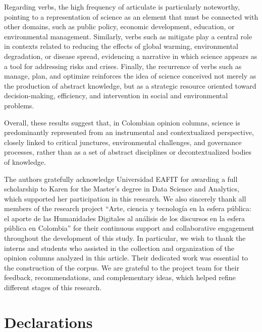 \documentclass[pdflatex,sn-mathphys-num,iicol]{sn-jnl}
\begin{document}
	
	Regarding verbs, the high frequency of articulate is particularly noteworthy, pointing to a representation of science as an element that must be connected with other domains, such as public policy, economic development, education, or environmental management. Similarly, verbs such as mitigate play a central role in contexts related to reducing the effects of global warming, environmental degradation, or disease spread, evidencing a narrative in which science appears as a tool for addressing risks and crises. Finally, the recurrence of verbs such as manage, plan, and optimize reinforces the idea of science conceived not merely as the production of abstract knowledge, but as a strategic resource oriented toward decision-making, efficiency, and intervention in social and environmental problems.
	
	
	Overall, these results suggest that, in Colombian opinion columns, science is predominantly represented from an instrumental and contextualized perspective, closely linked to critical junctures, environmental challenges, and governance processes, rather than as a set of abstract disciplines or decontextualized bodies of knowledge.
	
	
	\backmatter
	
	
	The authors gratefully acknowledge Universidad EAFIT for awarding a full scholarship to Karen for the Master's degree in Data Science and Analytics, which supported her participation in this research. We also sincerely thank all members of the research project ``Arte, ciencia y tecnolog{\'i}a en la esfera p{\'u}blica: el aporte de las Humanidades Digitales al an{\'a}lisis de los discursos en la esfera p{\'u}blica en Colombia'' for their continuous support and collaborative engagement throughout the development of this study. In particular, we wish to thank the interns and students who assisted in the collection and organization of the opinion columns analyzed in this article. Their dedicated work was essential to the construction of the corpus. We are grateful to the project team for their feedback, recommendations, and complementary ideas, which helped refine different stages of this research.
	
	
	\section*{Declarations}
	
\end{document}
